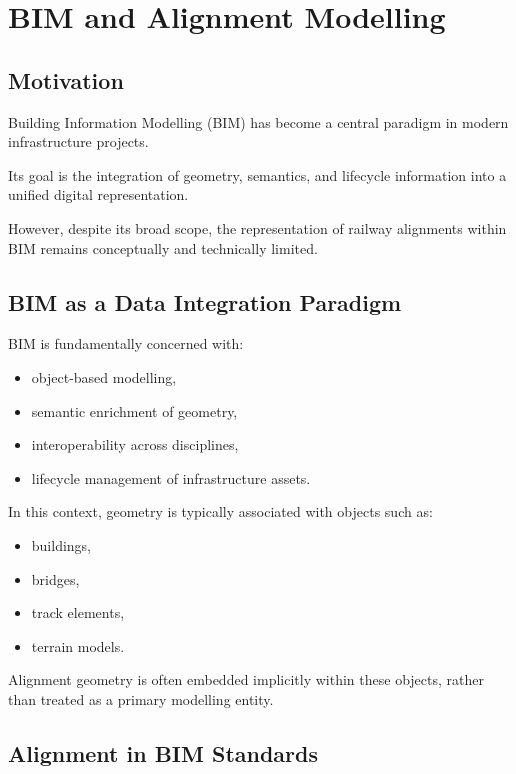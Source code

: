 
\chapter{BIM and Alignment Modelling}

\section*{Motivation}

Building Information Modelling (BIM) has become a central paradigm in
modern infrastructure projects.

Its goal is the integration of geometry, semantics, and lifecycle
information into a unified digital representation.

However, despite its broad scope, the representation of railway
alignments within BIM remains conceptually and technically limited.


\section{BIM as a Data Integration Paradigm}

BIM is fundamentally concerned with:
\begin{itemize}
\item object-based modelling,
\item semantic enrichment of geometry,
\item interoperability across disciplines,
\item lifecycle management of infrastructure assets.
\end{itemize}

In this context, geometry is typically associated with objects such as:
\begin{itemize}
\item buildings,
\item bridges,
\item track elements,
\item terrain models.
\end{itemize}

Alignment geometry is often embedded implicitly within these objects,
rather than treated as a primary modelling entity.


\section{Alignment in BIM Standards}

